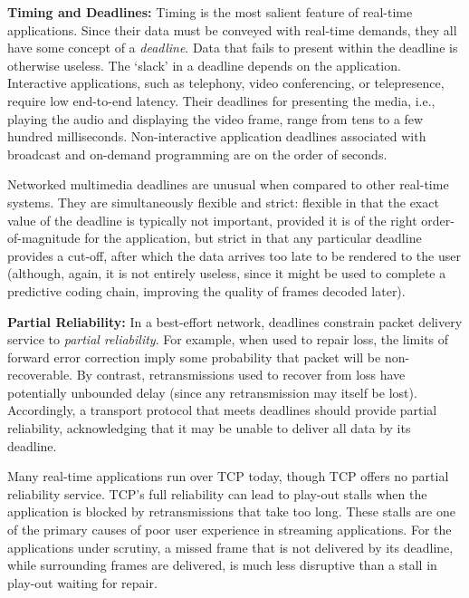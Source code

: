 \documentclass{sig-alternate-05-2015}
\newcommand{\ie}{{i.e.,}\xspace}
\begin{document}
\textbf{Timing and Deadlines:}
Timing is the most salient feature of real-time applications. Since their data
must be conveyed with real-time demands, they all have some concept of a
\emph{deadline}. Data that fails to present within the deadline is otherwise
useless.
The `slack' in a deadline depends on the application. Interactive applications,
such as telephony, video conferencing, or telepresence, require low end-to-end
latency. Their deadlines for presenting the media, \ie playing the audio and
displaying the video frame, range from tens to a few hundred milliseconds.
Non-interactive application deadlines associated with broadcast and on-demand
programming are on the order of seconds.

Networked multimedia deadlines are unusual when compared to other real-time
systems. They are simultaneously flexible and strict: flexible in that the exact
value of the deadline is typically not important, provided it is of the right
order-of-magnitude for the application, but strict in that any particular
deadline provides a cut-off, after which the data arrives too late to be
rendered to the user (although, again, it is not entirely useless, since
it might be used to complete a predictive coding chain, improving the quality 
of frames decoded later).

\textbf{Partial Reliability:}
In a best-effort network, deadlines
constrain packet delivery service to \emph{partial reliability}.
For example, when used to repair loss, the limits of forward error correction
imply some probability that packet will be non-recoverable. By contrast,
retransmissions used to recover from loss have potentially unbounded delay
(since any retransmission may itself be lost).
Accordingly, a transport protocol that meets deadlines should provide partial
reliability, acknowledging that it may be unable to deliver all data by its
deadline.

Many real-time applications run over TCP today, though TCP offers no partial
reliability service. TCP's full reliability can lead to play-out stalls
when the application is blocked by retransmissions that take too
long. These stalls are one of the primary causes of poor user experience in
streaming applications.
For the applications under scrutiny, a missed frame that is not delivered
by its deadline, while surrounding frames are delivered, is much less
disruptive than a stall in play-out waiting for repair.
\end{document}
